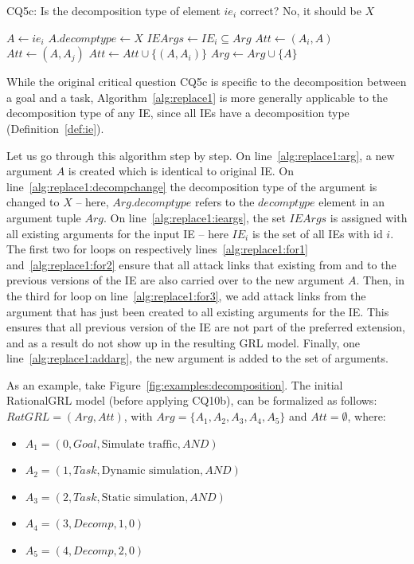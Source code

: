 \begin{algorithm}[h]
  \caption{CQ5c: Is the decomposition type of element $ie_i$ correct? No, it should be $X$ }\label{alg:replace1}
  \begin{algorithmic}[1]
    \State $A \leftarrow ie_i$\label{alg:replace1:arg}
    \State $A.decomptype\leftarrow X$\label{alg:replace1:decompchange}
    \State $IEArgs\leftarrow IE_i\subseteq  Arg$\label{alg:replace1:ieargs}
    \label{alg:replace1:for1}
      \State $Att\leftarrow (A_i,A)$
    \EndFor
    \label{alg:replace1:for2}
      \State $Att\leftarrow (A,A_j)$
    \label{alg:replace1:for3}
      \State $Att \leftarrow Att \cup \{(A,A_i)\}$\label{alg:replace1:att}
    \EndFor
    \EndFor
    \State $Arg\leftarrow Arg \cup \{A\}$\label{alg:replace1:addarg}
    \EndProcedure
  \end{algorithmic}
\end{algorithm}

While the original critical question CQ5c is specific to the decomposition between a goal and a task, Algorithm~\ref{alg:replace1} is more generally applicable to the decomposition type of any IE, since all IEs have a decomposition type (Definition~\ref{def:ie}). 

Let us go through this algorithm step by step. On line~\ref{alg:replace1:arg}, a new argument $A$ is created which is identical to original IE. On line~\ref{alg:replace1:decompchange} the decomposition type of the argument is changed to $X$ -- here, $Arg.decomptype$ refers to the $decomptype$ element in an argument tuple $Arg$. On line~\ref{alg:replace1:ieargs}, the set $IEArgs$ is assigned with all existing arguments for the input IE -- here $IE_i$ is the set of all IEs with id $i$. The first two for loops on respectively lines~\ref{alg:replace1:for1} and~\ref{alg:replace1:for2} ensure that all attack links that existing from and to the previous versions of the IE are also carried over to the new argument $A$. Then, in the third for loop on line~\ref{alg:replace1:for3}, we add attack links from the argument that has just been created to all existing arguments for the IE. This ensures that all previous version of the IE are not part of the preferred extension, and as a result do not show up in the resulting GRL model. Finally, one line~\ref{alg:replace1:addarg}, the new argument is added to the set of arguments.

As an example, take Figure~\ref{fig:examples:decomposition}. The initial RationalGRL model (before applying CQ10b), can be formalized as follows: $RatGRL=(Arg,Att)$, with $Arg=\{A_1,A_2,A_3,A_4,A_5\}$ and $Att=\emptyset$, where:
\begin{itemize}
\item $A_1=(0,Goal,\text{Simulate traffic},AND)$
\item $A_2=(1,Task,\text{Dynamic simulation},AND)$
\item $A_3=(2,Task,\text{Static simulation},AND)$
\item $A_4=(3,Decomp,1,0)$
\item $A_5=(4,Decomp,2,0)$
\end{itemize}

